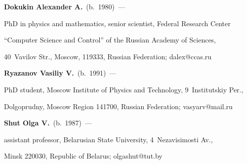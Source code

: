 \textbf{Dokukin Alexander A.}\ (b.\ 1980)~--- 


PhD in physics and mathematics, senior scientist, Federal Research Center 


``Computer Science and Control'' of the Russian Academy of Sciences,


 40~Vavilov Str., Moscow, 119333, Russian Federation; \mbox{dalex@ccas.ru} 


 


 \vspace*{3pt}





\noindent


\textbf{Ryazanov Vasiliy V.}\ (b.\ 1991)~--- 


PhD student, Moscow Institute of Physics and Technology, 9~Institutskiy Per., 


Dolgoprudny, Moscow Region 141700, Russian Federation; \mbox{vasyarv@mail.ru}





\vspace*{3pt}








\noindent


\textbf{Shut Olga V.}\ (b.\ 1987)~--- 


assistant professor, Belarusian State University, 4~Nezavisimosti Av., 


Minsk 220030, Republic of Belarus; \mbox{olgashut@tut.by}








\label{end\stat}








\renewcommand{\bibname}{\protect\rm Литература} 



